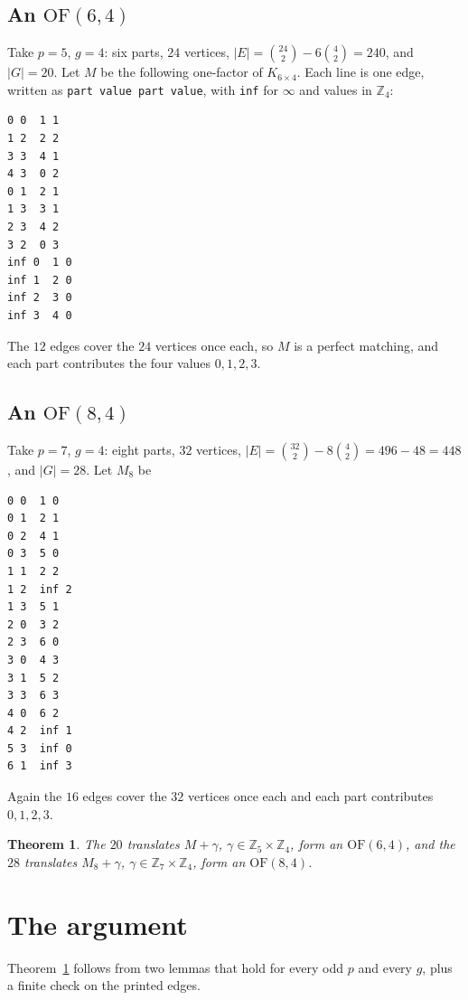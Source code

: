 \documentclass[11pt]{amsart}
\newtheorem{theorem}{Theorem}
\theoremstyle{remark}
\newcommand{\OF}{\mathrm{OF}}
\newcommand{\Km}[2]{K_{#1\times #2}}
\newcommand{\Zp}{\mathbb Z}
\begin{document}
\subsection*{An $\OF(6,4)$}
Take $p=5$, $g=4$: six parts, $24$ vertices, $|E|=\binom{24}2-6\binom42=240$,
and $|G|=20$. Let $M$ be the following one-factor of $\Km64$. Each line is one
edge, written as \texttt{part value part value}, with \texttt{inf} for
$\infty$ and values in $\Zp_4$:
\begin{center}
\begin{minipage}{0.42\textwidth}
\begin{verbatim}
0 0  1 1
1 2  2 2
3 3  4 1
4 3  0 2
0 1  2 1
1 3  3 1
2 3  4 2
3 2  0 3
inf 0  1 0
inf 1  2 0
inf 2  3 0
inf 3  4 0
\end{verbatim}
\end{minipage}
\end{center}
The $12$ edges cover the $24$ vertices once each, so $M$ is a perfect matching,
and each part contributes the four values $0,1,2,3$.

\subsection*{An $\OF(8,4)$}
Take $p=7$, $g=4$: eight parts, $32$ vertices,
$|E|=\binom{32}2-8\binom42=496-48=448$, and $|G|=28$. Let $M_8$ be
\begin{center}
\begin{minipage}{0.42\textwidth}
\begin{verbatim}
0 0  1 0
0 1  2 1
0 2  4 1
0 3  5 0
1 1  2 2
1 2  inf 2
1 3  5 1
2 0  3 2
2 3  6 0
3 0  4 3
3 1  5 2
3 3  6 3
4 0  6 2
4 2  inf 1
5 3  inf 0
6 1  inf 3
\end{verbatim}
\end{minipage}
\end{center}
Again the $16$ edges cover the $32$ vertices once each and each part
contributes $0,1,2,3$.

\begin{theorem}\label{thm:objects}
The $20$ translates $M+\gamma$, $\gamma\in\Zp_5\times\Zp_4$, form an
$\OF(6,4)$, and the $28$ translates $M_8+\gamma$,
$\gamma\in\Zp_7\times\Zp_4$, form an $\OF(8,4)$.
\end{theorem}

\section{The argument}

Theorem~\ref{thm:objects} follows from two lemmas that hold for every odd $p$
and every $g$, plus a finite check on the printed edges.
\end{document}
